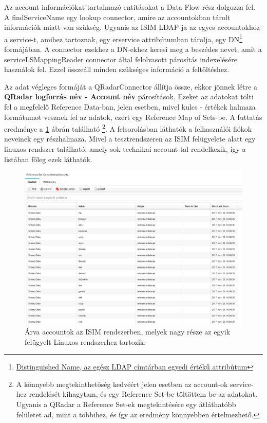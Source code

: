 Az account információkat tartalmazó entitásokat a Data Flow rész dolgozza fel. A findServiceName egy lookup connector, amire az accountokban tárolt információk miatt van szükség. Ugyanis az ISIM LDAP-ja az egyes accountokhoz a service-t, amihez tartoznak, egy erservice attribútumban tárolja, egy DN\footnote{\href{https://www.ldap.com/ldap-dns-and-rdns}{Distinguished Name, az egész LDAP címtárban egyedi értékű attribútum}} formájában. A connector ezekhez a DN-ekhez keresi meg a beszédes nevet, amit a serviceLSMappingReader connector által felolvasott párosítás indexelésére használok fel. Ezzel összeáll minden szükséges információ a feltöltéshez.

Az adat végleges formáját a QRadarConnector állítja össze, ekkor jönnek létre a \textbf{QRadar logforrás név - Account név } párosítások. Ezeket az adatokat tölti fel a megfelelő Reference Data-ban, jelen esetben, mivel kulcs - értékek halmaza formátumot vesznek fel az adatok, ezért egy Reference Map of Sets-be. A futtatás eredménye a \ref{fig:orphanaccountresult} ábrán található
\footnote{A könnyebb megtekinthetőség kedvéért jelen esetben az account-ok service-hez rendelését kihagytam, és egy Reference Set-be töltöttem be az adatokat. Ugyanis a QRadar a Reference Set-ek megtekintésére egy átláthatóbb felületet ad, mint a többihez, és így az eredmény könnyebben értelmezhető.}. 
A felsorolásban láthatók a felhasználói fiókok neveinek egy részhalmaza. Mivel a tesztrendszeren az ISIM felügyelete alatt egy linuxos rendszer található, amely sok technikai account-tal rendelkezik, így a listában főleg ezek láthatók.

\begin{figure}[h]
	\centering
	\includegraphics[width=0.9\linewidth]{figures/conn_test/orphanAccountResult}
	\caption{Árva accountok az ISIM rendszerben, melyek nagy része az egyik felügyelt Linuxos rendszerhez tartozik.}
	\label{fig:orphanaccountresult}
\end{figure}

